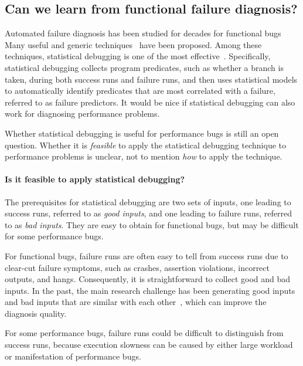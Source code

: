 \subsection{Can we learn from functional failure diagnosis?}
\label{sec:5_canwe}
Automated failure diagnosis has been studied for decades for functional 
bugs
Many useful and generic techniques~\citep{horwitz, xiangyu.ase05, delta,liblit03,CCI,tarantula1} have been proposed.
Among these techniques,
statistical debugging is one of the most effective~\citep{liblit03,CCI,tarantula1}. 
Specifically, statistical debugging
collects program predicates, such as
whether a branch is taken, during both success runs and failure runs, and
then uses
statistical models to automatically identify predicates that are most
correlated with a failure, referred to as failure predictors.
It would be nice if statistical debugging can also work for diagnosing
performance problems.

Whether statistical debugging is useful for performance bugs is 
still an open question. Whether it is \textit{feasible} to apply
the statistical debugging technique to performance problems is unclear, 
not to mention 
\textit{how} to apply the technique.

\paragraph{Is it feasible to apply statistical debugging?}
The prerequisites for statistical debugging are two sets of inputs, one
leading to success runs, referred to as \emph{good inputs}, and one leading to 
failure runs, referred to as \emph{bad inputs}.
They are easy to obtain for functional bugs, but may be difficult for some
performance bugs.

For functional bugs, failure runs are often easy to tell from success runs 
due to clear-cut failure symptoms, such as 
crashes, assertion violations, incorrect outputs, and hangs. Consequently, 
it is straightforward to collect good and bad inputs. 
In the past, the main research challenge has been generating good inputs and 
bad inputs
that are similar with each other~\citep{delta}, which can improve the diagnosis
quality.

For some performance bugs, failure runs could be difficult to distinguish
from success runs, because execution slowness can be
caused by either large workload or manifestation of performance bugs.

